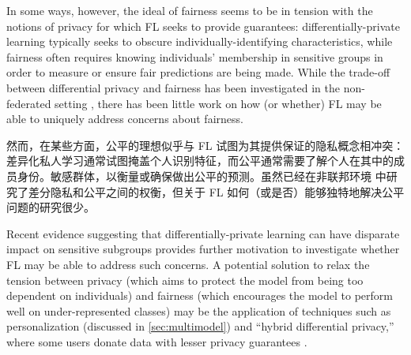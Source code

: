 In some ways, however, the ideal of fairness seems to be in tension with the notions of privacy for which FL seeks to provide guarantees: differentially-private learning typically seeks to obscure individually-identifying characteristics, while fairness often requires knowing individuals' membership in sensitive groups in order to measure or ensure fair predictions are being made. While the trade-off between differential privacy and fairness has been investigated in the non-federated setting \cite{jagielski2018privatefair, CGKM19}, there has been little work on how (or whether) FL may be able to uniquely address concerns about fairness. 


然而，在某些方面，公平的理想似乎与 FL 试图为其提供保证的隐私概念相冲突：差异化私人学习通常试图掩盖个人识别特征，而公平通常需要了解个人在其中的成员身份。敏感群体，以衡量或确保做出公平的预测。虽然已经在非联邦环境\cite{jagielski2018privatefair, CGKM19} 中研究了差分隐私和公平之间的权衡，但关于 FL 如何（或是否）能够独特地解决公平问题的研究很少。


Recent evidence suggesting that differentially-private learning can have disparate impact on sensitive subgroups \cite{bagdasaryan2019disparate, CGKM19, jagielski2018privatefair, kuppam2019fair} provides further motivation to investigate whether FL may be able to address such concerns. A potential solution to relax the tension between privacy (which aims to protect the model from being too dependent on individuals) and fairness (which encourages the model to perform well on under-represented classes) may be the application of techniques such as personalization (discussed in \cref{sec:multimodel}) and ``hybrid differential privacy,'' where some users donate data with lesser privacy guarantees \cite{avent2017blender}. 


